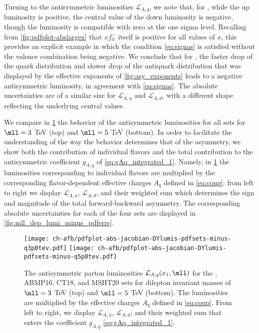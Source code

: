 Turning to the antisymmetric \pdf luminosities $\mathcal{L}_{A,q}$,
we note  that, for , while the up luminosity is
positive, the central value of the down luminosity is negative, though
the luminosity is compatible with zero at the one sigma level.
%
Recalling
from \cref{fig:pdfplot-abslargex} that $xf_{d}^-$ itself is
positive for all values of $x$,  this provides an explicit example in
which the condition \cref{eq:signas} is satisfied without the valence
combination being negative.
%
We conclude that for , the faster
drop of the quark distribution and slower drop of the antiquark
distribution that was displayed by the effective exponents of
\cref{fig:asy_exponents} leads to a negative antisymmetric
luminosity, in agreement with \cref{eq:signas}.
The absolute \pdf uncertainties are of a similar size for
$\mathcal{L}_{A,u}$ and $\mathcal{L}_{A,d}$, with a different shape
reflecting the underlying central values.

We compare
in \cref{fig:mll_dep_lumi_minus}
the behavior of the antisymmetric luminosities for all \pdf
sets for $\mll=3$ TeV (top) and $\mll=5$ TeV (bottom).
%
In order to facilitate the understanding of the way the \pdf behavior
determines that of the asymmetry, we show both the contribution of
individual flavors and the total contribution
to the antisymmetric coefficient $g_{A,q}$ of
\cref{eq:gAq_integrated_1}. Namely, in
\cref{fig:mll_dep_lumi_minus} the luminosities corresponding to
individual flavors are multiplied by the corresponding flavor-dependent
effective charges $A_q$ defined in \cref{eq:coup}:
from left to right we display $\mathcal{L}_{A,u}$,  $\mathcal{L}_{A,d}$,
and their weighted sum
 which determines
the sign and magnitude of the total forward-backward asymmetry.
%
The corresponding absolute \pdf uncertainties for each of the four \pdf sets
are displayed in  \cref{fig:mll_dep_lumi_minus_pdferrs}.

\begin{figure}[!t]
 \centering
 \texttt{[image: ch-afb/pdfplot-abs-jacobian-DYlumis-pdfsets-minus-q3p0tev.pdf]}
 \texttt{[image: ch-afb/pdfplot-abs-jacobian-DYlumis-pdfsets-minus-q5p0tev.pdf]}
 \caption{The antisymmetric 
   parton luminosities $\mathcal{L}_{A,q}(x_1,\mll)$ for the , ABMP16,
   CT18, and MSHT20 \nnlo \pdf sets for dilepton
   invariant masses of
   $\mll=3$ TeV (top) and $\mll=5$ TeV (bottom).
   The luminosities are multiplied by the effective charges
   $A_q$ defined in \cref{eq:coup}.
   From left to right, we display $\mathcal{L}_{A,u}$,  $\mathcal{L}_{A,d}$,
   and their weighted sum that enters the  coefficient $g_{A,q}$ \cref{eq:gAq_integrated_1}.
    }    
 \label{fig:mll_dep_lumi_minus}
\end{figure}

